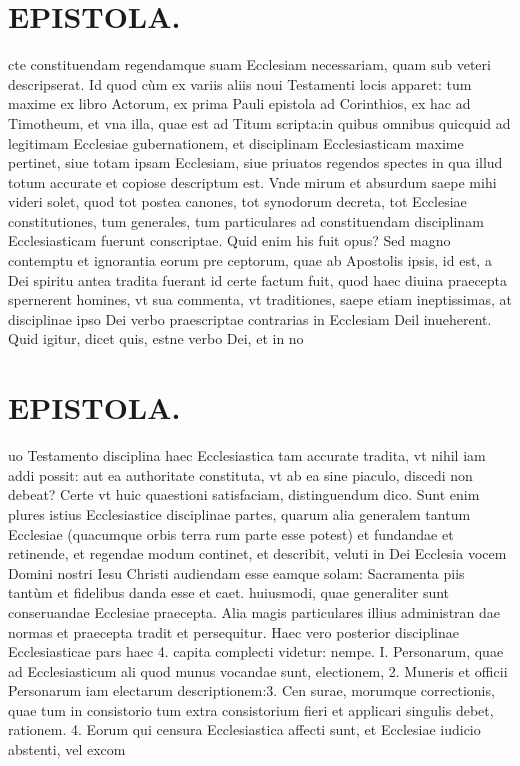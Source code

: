\documentclass{article}
\begin{document}
\begin{pages}
\section*{EPISTOLA. }\pstart cte constituendam regendamque suam Ecclesiam necessariam, quam sub veteri descripserat. Id quod cùm ex variis aliis noui Testamenti locis apparet: tum maxime ex libro Actorum, ex prima Pauli epistola ad Corinthios, ex hac ad Timotheum, et vna illa, quae est ad Titum scripta:in quibus omnibus quicquid ad legitimam Ecclesiae gubernationem, et disciplinam Ecclesiasticam maxime pertinet, siue totam ipsam Ecclesiam, siue priuatos regendos spectes in qua illud totum accurate et copiose descriptum est. Vnde mirum et absurdum saepe mihi videri solet, quod tot postea canones, tot synodorum decreta, tot Ecclesiae constitutiones, tum generales, tum particulares ad constituendam disciplinam Ecclesiasticam fuerunt conscriptae. Quid enim his fuit opus? Sed magno contemptu et ignorantia eorum pre ceptorum, quae ab Apostolis ipsis, id est, a Dei spiritu antea tradita fuerant id certe factum fuit, quod haec diuina praecepta spernerent homines, vt sua commenta, vt traditiones, saepe etiam ineptissimas, at disciplinae ipso Dei verbo praescriptae contrarias in Ecclesiam Deil inueherent. Quid igitur, dicet quis, estne verbo Dei, et in no\pend
\section*{EPISTOLA. }\pstart uo Testamento disciplina haec Ecclesiastica tam accurate tradita, vt nihil iam addi possit: aut ea authoritate constituta, vt ab ea sine piaculo, discedi non debeat? Certe vt huic quaestioni satisfaciam, distinguendum dico. Sunt enim plures istius Ecclesiastice disciplinae partes, quarum alia generalem tantum Ecclesiae (quacumque orbis terra rum parte esse potest) et fundandae et retinende, et regendae modum continet, et describit, veluti in Dei Ecclesia vocem Domini nostri Iesu Christi audiendam esse eamque solam: Sacramenta piis tantùm et fidelibus danda esse et caet. huiusmodi, quae generaliter sunt conseruandae Ecclesiae praecepta. Alia magis particulares illius administran dae normas et praecepta tradit et persequitur. Haec vero posterior disciplinae Ecclesiasticae pars haec 4. capita complecti videtur: nempe. I. Personarum, quae ad Ecclesiasticum ali quod munus vocandae sunt, electionem, 2. Muneris et officii Personarum iam electarum descriptionem:3. Cen surae, morumque correctionis, quae tum in consistorio tum extra consistorium fieri et applicari singulis debet, rationem. 4. Eorum qui censura Ecclesiastica affecti sunt, et Ecclesiae iudicio abstenti, vel excom\pend

\end{pages}
\end{document}
